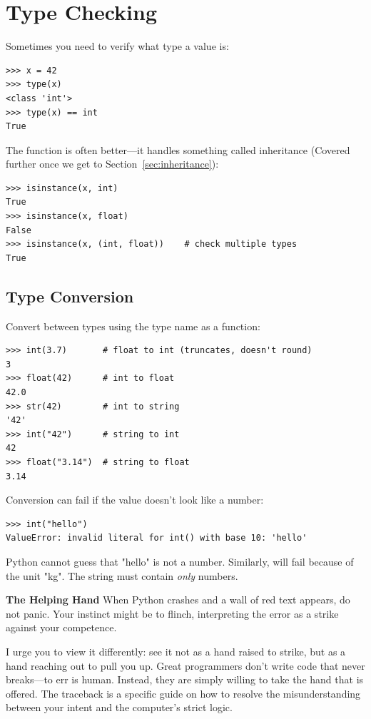 \section{Type Checking}
\label{sec:type-checking}

Sometimes you need to verify what type a value is:

\begin{lstlisting}
>>> x = 42
>>> type(x)
<class 'int'>
>>> type(x) == int
True
\end{lstlisting}

The  function is often better---it handles something called inheritance (Covered further once we get to Section~\ref{sec:inheritance}):

\begin{lstlisting}
>>> isinstance(x, int)
True
>>> isinstance(x, float)
False
>>> isinstance(x, (int, float))    # check multiple types
True
\end{lstlisting}

\subsection{Type Conversion}

Convert between types using the type name as a function:

\begin{lstlisting}
>>> int(3.7)       # float to int (truncates, doesn't round)
3
>>> float(42)      # int to float
42.0
>>> str(42)        # int to string
'42'
>>> int("42")      # string to int
42
>>> float("3.14")  # string to float
3.14
\end{lstlisting}

\begin{warning}
Conversion can fail if the value doesn't look like a number:
\begin{lstlisting}
>>> int("hello")
ValueError: invalid literal for int() with base 10: 'hello'
\end{lstlisting}
Python cannot guess that "hello" is not a number. Similarly,  will fail because of the unit "kg". The string must contain \emph{only} numbers.
\end{warning}


\begin{tip}
\textbf{The Helping Hand}
When Python crashes and a wall of red text appears, do not panic. Your instinct might be to flinch, interpreting the error as a strike against your competence.

I urge you to view it differently: see it not as a hand raised to strike, but as a hand reaching out to pull you up. Great programmers don't write code that never breaks—to err is human. Instead, they are simply willing to take the hand that is offered. The traceback is a specific guide on how to resolve the misunderstanding between your intent and the computer's strict logic.
\end{tip}

